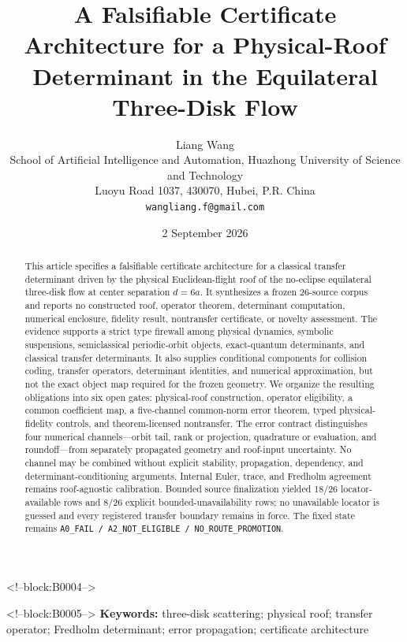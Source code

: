 \documentclass[11pt,a4paper]{article}
\title{A Falsifiable Certificate Architecture for a Physical-Roof Determinant in the Equilateral Three-Disk Flow}
\author{Liang Wang\\
\small School of Artificial Intelligence and Automation, Huazhong University of Science and Technology\\
\small Luoyu Road 1037, 430070, Hubei, P.R. China\\
\small \texttt{wangliang.f@gmail.com}}
\date{2 September 2026}
\begin{document}
\maketitle

<!--block:B0004-->
\begin{abstract}
This article specifies a falsifiable certificate architecture for a classical transfer determinant driven by the physical Euclidean-flight roof of the no-eclipse equilateral three-disk flow at center separation \(d=6a\). It synthesizes a frozen 26-source corpus and reports no constructed roof, operator theorem, determinant computation, numerical enclosure, fidelity result, nontransfer certificate, or novelty assessment. The evidence supports a strict type firewall among physical dynamics, symbolic suspensions, semiclassical periodic-orbit objects, exact-quantum determinants, and classical transfer determinants. It also supplies conditional components for collision coding, transfer operators, determinant identities, and numerical approximation, but not the exact object map required for the frozen geometry. We organize the resulting obligations into six open gates: physical-roof construction, operator eligibility, a common coefficient map, a five-channel common-norm error theorem, typed physical-fidelity controls, and theorem-licensed nontransfer. The error contract distinguishes four numerical channels---orbit tail, rank or projection, quadrature or evaluation, and roundoff---from separately propagated geometry and roof-input uncertainty. No channel may be combined without explicit stability, propagation, dependency, and determinant-conditioning arguments. Internal Euler, trace, and Fredholm agreement remains roof-agnostic calibration. Bounded source finalization yielded 18/26 locator-available rows and 8/26 explicit bounded-unavailability rows; no unavailable locator is guessed and every registered transfer boundary remains in force. The fixed state remains \texttt{A0\_FAIL / A2\_NOT\_ELIGIBLE / NO\_ROUTE\_PROMOTION}.
\end{abstract}

<!--block:B0005-->
\noindent\textbf{Keywords:} three-disk scattering; physical roof; transfer operator; Fredholm determinant; error propagation; certificate architecture
\end{document}
